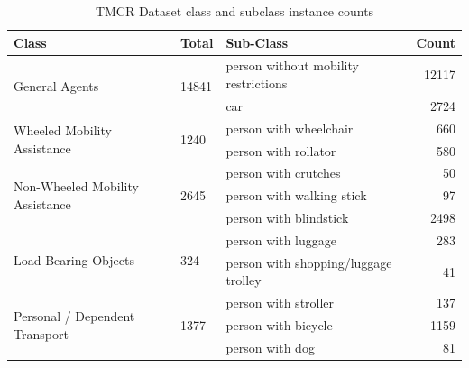 \documentclass[journal,twoside,web]{ieeecolor}
\begin{document}
\begin{table}[t]
\centering
\caption{TMCR Dataset class and subclass instance counts}
\label{tab:simple4-clean}
\begin{tabular}{p{1.5cm} l l r}
\toprule
\textbf{Class} & \textbf{Total} & \textbf{Sub-Class} & \textbf{Count} \\
\midrule

\multirow{2}{=}{General Agents} & \multirow{2}{*}{14841} & person without mobility restrictions & 12117 \\ 
\cmidrule(lr){3-4}
                                &                         & car                                  & 2724 \\ 
\midrule

\multirow{2}{=}{Wheeled Mobility Assistance} & \multirow{2}{*}{1240} & person with wheelchair & 660 \\ 
\cmidrule(lr){3-4}
                                             &                        & person with rollator   & 580 \\ 
\midrule

\multirow{3}{=}{Non-Wheeled Mobility Assistance} & \multirow{3}{*}{2645} & person with crutches      & 50 \\ 
\cmidrule(lr){3-4}
                                                 &                        & person with walking stick & 97 \\ 
\cmidrule(lr){3-4}
                                                 &                        & person with blindstick    & 2498 \\ 
\midrule

\multirow{2}{=}{Load-Bearing Objects} & \multirow{2}{*}{324} & person with luggage                & 283 \\ 
\cmidrule(lr){3-4}
                                      &                        & person with shopping/luggage trolley & 41 \\ 
\midrule

\multirow{3}{=}{Personal / Dependent Transport} & \multirow{3}{*}{1377} & person with stroller & 137 \\ 
\cmidrule(lr){3-4}
                                                &                        & person with bicycle  & 1159 \\ 
\cmidrule(lr){3-4}
                                                &                        & person with dog      & 81 \\ 
\bottomrule
\end{tabular}
\end{table}
\end{document}
